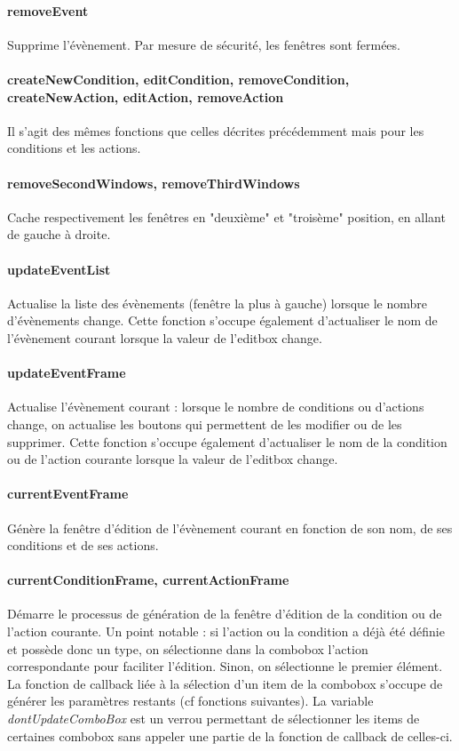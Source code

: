 \documentclass[a4paper]{article}
\begin{document}
\paragraph{removeEvent} Supprime l'évènement. Par mesure de sécurité, les fenêtres sont fermées.
\paragraph{createNewCondition, editCondition, removeCondition, createNewAction, editAction, removeAction} Il s'agit des mêmes fonctions que celles décrites précédemment mais pour les conditions et les actions.
\paragraph{removeSecondWindows, removeThirdWindows} Cache respectivement les fenêtres en "deuxième" et "troisème" position, en allant de gauche à droite.
\paragraph{updateEventList} Actualise la liste des évènements (fenêtre la plus à gauche) lorsque le nombre d'évènements change. Cette fonction s'occupe également d'actualiser le nom de l'évènement courant lorsque la valeur de l'editbox change. 
\paragraph{updateEventFrame} Actualise l'évènement courant : lorsque le nombre de conditions ou d'actions change, on actualise les boutons qui permettent de les modifier ou de les supprimer. Cette fonction s'occupe également d'actualiser le nom de la condition ou de l'action courante lorsque la valeur de l'editbox change.
\paragraph{currentEventFrame} Génère la fenêtre d'édition de l'évènement courant en fonction de son nom, de ses conditions et de ses actions.
\paragraph{currentConditionFrame, currentActionFrame} Démarre le processus de génération de la fenêtre d'édition de la condition ou de l'action courante. Un point notable : si l'action ou la condition a déjà été définie et possède donc un type, on sélectionne dans la combobox l'action correspondante pour faciliter l'édition. Sinon, on sélectionne le premier élément. La fonction de callback liée à la sélection d'un item de la combobox s'occupe de générer les paramètres restants (cf fonctions suivantes). La variable \textit{dontUpdateComboBox} est un verrou permettant de sélectionner les items de certaines combobox sans appeler une partie de la fonction de callback de celles-ci.
\end{document}
